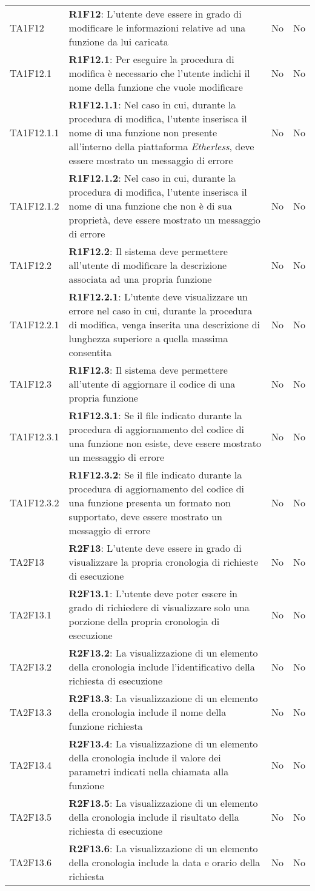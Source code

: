 \begin{longtable}{ 
		>{\centering}p{} 
		>{}p{} 
		>{\centering}p{}
		>{\centering}p{} }
	TA1F12 & \textbf{R1F12}: L'utente deve essere in grado di modificare le informazioni relative 
		ad una funzione da lui caricata 											& No & No \tabularnewline
	TA1F12.1 & \textbf{R1F12.1}: Per eseguire la procedura di modifica è necessario che l'utente 
		indichi il nome della funzione che vuole modificare 						& No & No \tabularnewline
	TA1F12.1.1 & \textbf{R1F12.1.1}: Nel caso in cui, durante la procedura di modifica, l'utente 
		inserisca il nome di una funzione non presente all'interno della piattaforma
		\textit{Etherless}, deve essere mostrato un messaggio di errore				& No & No \tabularnewline
	TA1F12.1.2 & \textbf{R1F12.1.2}: Nel caso in cui, durante la procedura di modifica, l'utente 
		inserisca il nome di una funzione che non è di sua proprietà, deve essere 
		mostrato un messaggio di errore												& No & No \tabularnewline
	TA1F12.2 & \textbf{R1F12.2}: Il sistema deve permettere all'utente di modificare la descrizione 
		associata ad una propria funzione 											& No & No \tabularnewline
	TA1F12.2.1 & \textbf{R1F12.2.1}: L'utente deve visualizzare un errore nel caso in cui, durante 
		la procedura di modifica, venga inserita una descrizione di lunghezza
		superiore a quella massima consentita 										& No & No \tabularnewline
	TA1F12.3 & \textbf{R1F12.3}: Il sistema deve permettere all'utente di aggiornare il codice di 
		una propria funzione 														& No & No \tabularnewline	
	TA1F12.3.1 & \textbf{R1F12.3.1}: Se il file indicato durante la procedura di aggiornamento del 
		codice di una funzione non esiste, deve essere mostrato un messaggio di 
		errore																		& No & No \tabularnewline
	TA1F12.3.2 & \textbf{R1F12.3.2}: Se il file indicato durante la procedura di aggiornamento del codice di una funzione presenta un formato
	non supportato, deve essere	mostrato un messaggio di errore						& No & No \tabularnewline
		
	TA2F13 & \textbf{R2F13}: L'utente deve essere in grado di visualizzare la propria cronologia 
		di richieste di esecuzione 													& No & No \tabularnewline
	TA2F13.1 & \textbf{R2F13.1}: L'utente deve poter essere in grado di richiedere di visualizzare
		solo una porzione della propria cronologia di esecuzione 					& No & No \tabularnewline
	TA2F13.2 & \textbf{R2F13.2}: La visualizzazione di un elemento della cronologia include 
		l'identificativo della richiesta di esecuzione 								& No & No \tabularnewline
	TA2F13.3 & \textbf{R2F13.3}: La visualizzazione di un elemento della cronologia include 
		il nome della funzione richiesta 											& No & No \tabularnewline				
	TA2F13.4 & \textbf{R2F13.4}: La visualizzazione di un elemento della cronologia include 
		il valore dei parametri indicati nella chiamata alla funzione				& No & No \tabularnewline
	TA2F13.5 & \textbf{R2F13.5}: La visualizzazione di un elemento della cronologia include 
		il risultato della richiesta di esecuzione									& No & No \tabularnewline
	TA2F13.6 & \textbf{R2F13.6}: La visualizzazione di un elemento della cronologia include 
		la data e orario della richiesta 											& No & No \tabularnewline
	

\end{longtable}
